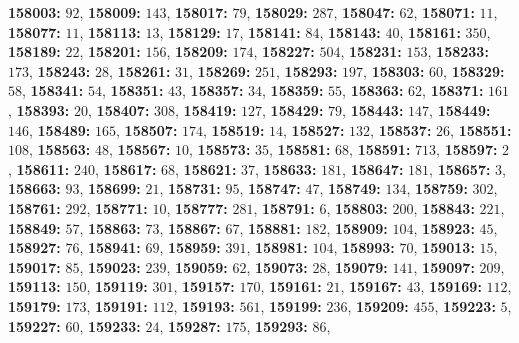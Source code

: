 \textsf{\bfseries 158003:} $92$, \textsf{\bfseries 158009:} $143$, \textsf{\bfseries 158017:} $79$, \textsf{\bfseries 158029:} $287$, \textsf{\bfseries 158047:} $62$, \textsf{\bfseries 158071:} $11$, \textsf{\bfseries 158077:} $11$, \textsf{\bfseries 158113:} $13$, \textsf{\bfseries 158129:} $17$, \textsf{\bfseries 158141:} $84$, \textsf{\bfseries 158143:} $40$, \textsf{\bfseries 158161:} $350$, \textsf{\bfseries 158189:} $22$, \textsf{\bfseries 158201:} $156$, \textsf{\bfseries 158209:} $174$, \textsf{\bfseries 158227:} $504$, \textsf{\bfseries 158231:} $153$, \textsf{\bfseries 158233:} $173$, \textsf{\bfseries 158243:} $28$, \textsf{\bfseries 158261:} $31$, \textsf{\bfseries 158269:} $251$, \textsf{\bfseries 158293:} $197$, \textsf{\bfseries 158303:} $60$, \textsf{\bfseries 158329:} $58$, \textsf{\bfseries 158341:} $54$, \textsf{\bfseries 158351:} $43$, \textsf{\bfseries 158357:} $34$, \textsf{\bfseries 158359:} $55$, \textsf{\bfseries 158363:} $62$, \textsf{\bfseries 158371:} $161$, \textsf{\bfseries 158393:} $20$, \textsf{\bfseries 158407:} $308$, \textsf{\bfseries 158419:} $127$, \textsf{\bfseries 158429:} $79$, \textsf{\bfseries 158443:} $147$, \textsf{\bfseries 158449:} $146$, \textsf{\bfseries 158489:} $165$, \textsf{\bfseries 158507:} $174$, \textsf{\bfseries 158519:} $14$, \textsf{\bfseries 158527:} $132$, \textsf{\bfseries 158537:} $26$, \textsf{\bfseries 158551:} $108$, \textsf{\bfseries 158563:} $48$, \textsf{\bfseries 158567:} $10$, \textsf{\bfseries 158573:} $35$, \textsf{\bfseries 158581:} $68$, \textsf{\bfseries 158591:} $713$, \textsf{\bfseries 158597:} $2$, \textsf{\bfseries 158611:} $240$, \textsf{\bfseries 158617:} $68$, \textsf{\bfseries 158621:} $37$, \textsf{\bfseries 158633:} $181$, \textsf{\bfseries 158647:} $181$, \textsf{\bfseries 158657:} $3$, \textsf{\bfseries 158663:} $93$, \textsf{\bfseries 158699:} $21$, \textsf{\bfseries 158731:} $95$, \textsf{\bfseries 158747:} $47$, \textsf{\bfseries 158749:} $134$, \textsf{\bfseries 158759:} $302$, \textsf{\bfseries 158761:} $292$, \textsf{\bfseries 158771:} $10$, \textsf{\bfseries 158777:} $281$, \textsf{\bfseries 158791:} $6$, \textsf{\bfseries 158803:} $200$, \textsf{\bfseries 158843:} $221$, \textsf{\bfseries 158849:} $57$, \textsf{\bfseries 158863:} $73$, \textsf{\bfseries 158867:} $67$, \textsf{\bfseries 158881:} $182$, \textsf{\bfseries 158909:} $104$, \textsf{\bfseries 158923:} $45$, \textsf{\bfseries 158927:} $76$, \textsf{\bfseries 158941:} $69$, \textsf{\bfseries 158959:} $391$, \textsf{\bfseries 158981:} $104$, \textsf{\bfseries 158993:} $70$, \textsf{\bfseries 159013:} $15$, \textsf{\bfseries 159017:} $85$, \textsf{\bfseries 159023:} $239$, \textsf{\bfseries 159059:} $62$, \textsf{\bfseries 159073:} $28$, \textsf{\bfseries 159079:} $141$, \textsf{\bfseries 159097:} $209$, \textsf{\bfseries 159113:} $150$, \textsf{\bfseries 159119:} $301$, \textsf{\bfseries 159157:} $170$, \textsf{\bfseries 159161:} $21$, \textsf{\bfseries 159167:} $43$, \textsf{\bfseries 159169:} $112$, \textsf{\bfseries 159179:} $173$, \textsf{\bfseries 159191:} $112$, \textsf{\bfseries 159193:} $561$, \textsf{\bfseries 159199:} $236$, \textsf{\bfseries 159209:} $455$, \textsf{\bfseries 159223:} $5$, \textsf{\bfseries 159227:} $60$, \textsf{\bfseries 159233:} $24$, \textsf{\bfseries 159287:} $175$, \textsf{\bfseries 159293:} $86$, 
